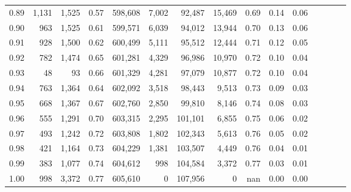 \begin{tabular}{rrrcrrrrrrrrrrr}
0.89 &   1,131 &  1,525 &                                       0.57 &  598,608 &    7,002 &   92,487 &   15,469 &  0.69 &  0.14 &                         0.06 \\
0.90 &     963 &  1,525 &                                       0.61 &  599,571 &    6,039 &   94,012 &   13,944 &  0.70 &  0.13 &                         0.06 \\
0.91 &     928 &  1,500 &                                       0.62 &  600,499 &    5,111 &   95,512 &   12,444 &  0.71 &  0.12 &                         0.05 \\
0.92 &     782 &  1,474 &                                       0.65 &  601,281 &    4,329 &   96,986 &   10,970 &  0.72 &  0.10 &                         0.04 \\
0.93 &      48 &     93 &                                       0.66 &  601,329 &    4,281 &   97,079 &   10,877 &  0.72 &  0.10 &                         0.04 \\
0.94 &     763 &  1,364 &                                       0.64 &  602,092 &    3,518 &   98,443 &    9,513 &  0.73 &  0.09 &                         0.03 \\
0.95 &     668 &  1,367 &                                       0.67 &  602,760 &    2,850 &   99,810 &    8,146 &  0.74 &  0.08 &                         0.03 \\
0.96 &     555 &  1,291 &                                       0.70 &  603,315 &    2,295 &  101,101 &    6,855 &  0.75 &  0.06 &                         0.02 \\
0.97 &     493 &  1,242 &                                       0.72 &  603,808 &    1,802 &  102,343 &    5,613 &  0.76 &  0.05 &                         0.02 \\
0.98 &     421 &  1,164 &                                       0.73 &  604,229 &    1,381 &  103,507 &    4,449 &  0.76 &  0.04 &                         0.01 \\
0.99 &     383 &  1,077 &                                       0.74 &  604,612 &      998 &  104,584 &    3,372 &  0.77 &  0.03 &                         0.01 \\
1.00 &     998 &  3,372 &                                       0.77 &  605,610 &        0 &  107,956 &        0 &   nan &  0.00 &                         0.00 \\
\bottomrule
\end{tabular}
